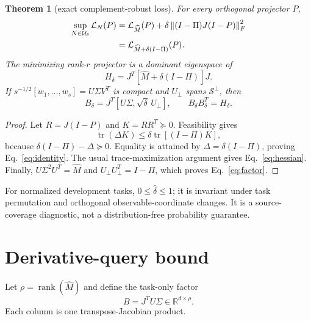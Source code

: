 \documentclass[10pt,letterpaper,twoside]{article}
\newtheorem{theorem}{Theorem}
\newcommand{\R}{\mathbb R}
\newcommand{\I}{I}
\newcommand{\J}{J}
\newcommand{\M}{M}
\newcommand{\norm}[1]{\left\lVert #1\right\rVert}
\newcommand{\tr}{\operatorname{tr}}
\newcommand{\rank}{\operatorname{rank}}
\begin{document}
\begin{theorem}[exact complement-robust loss]
\label{thm:robust}
For every orthogonal projector $P$,
\begin{align}
 \sup_{N\in\mathcal U_\delta}\mathcal L_N(P)
 &=\mathcal L_{\widehat\M}(P)
 +\delta\norm{(\I-\Pi)\J(\I-P)}_F^2                 \notag\\
 &=\mathcal L_{\widehat\M+\delta(\I-\Pi)}(P).        \label{eq:identity}
\end{align}
The minimizing rank-$r$ projector is a dominant eigenspace of
\begin{equation}
 H_\delta=\J^T[\widehat\M+\delta(\I-\Pi)]\J.          \label{eq:hessian}
\end{equation}
If $s^{-1/2}[w_1,\ldots,w_s]=U\Sigma V^T$ is compact and
$U_\perp$ spans $\mathcal S^\perp$, then
\begin{equation}
 B_\delta=\J^T[U\Sigma,\sqrt{\delta}\,U_\perp],
 \qquad B_\delta B_\delta^T=H_\delta.                \label{eq:factor}
\end{equation}
\end{theorem}

\begin{proof}
Let $R=\J(\I-P)$ and $K=RR^T\succeq0$.  Feasibility gives
\begin{equation}
 \tr(\Delta K)\le\delta\tr[(\I-\Pi)K],
\end{equation}
because $\delta(\I-\Pi)-\Delta\succeq0$.  Equality is attained by
$\Delta=\delta(\I-\Pi)$, proving Eq.~\eqref{eq:identity}.  The usual
trace-maximization argument gives Eq.~\eqref{eq:hessian}.  Finally,
$U\Sigma^2U^T=\widehat\M$ and
$U_\perp U_\perp^T=\I-\Pi$, which proves Eq.~\eqref{eq:factor}.
\end{proof}

For normalized development tasks, $0\le\widehat\delta\le1$; it is invariant
under task permutation and orthogonal observable-coordinate changes.  It is a
source-coverage diagnostic, not a distribution-free probability guarantee.

\section{Derivative-query bound}

Let $\rho=\rank(\widehat\M)$ and define the task-only factor
\begin{equation}
 B=\J^TU\Sigma\in\R^{d\times\rho}.                   \label{eq:taskfactor}
\end{equation}
Each column is one transpose-Jacobian product.
\end{document}
